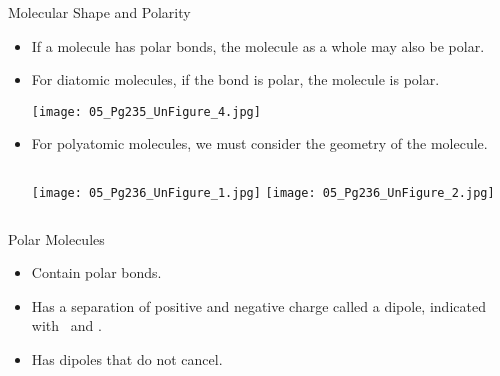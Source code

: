 \documentclass[notes=only]{beamer}
\begin{document}
%
%

\begin{frame}{Molecular Shape and Polarity}
	\begin{itemize}
		\item If a molecule has polar bonds, the molecule as a whole may
			also be polar. \pause
		\item For diatomic molecules, if the bond is polar, the molecule
			is polar.

			\begin{center}
				\texttt{[image: 05\_Pg235\_UnFigure\_4.jpg]}
			\end{center}

			\pause

		\item For polyatomic molecules, we must consider the
			\alert{geometry} of the molecule.

			\begin{columns}
				\centering
				\texttt{[image: 05\_Pg236\_UnFigure\_1.jpg]}
				\centering
				\texttt{[image: 05\_Pg236\_UnFigure\_2.jpg]}
			\end{columns}
	\end{itemize}
\end{frame}

\begin{frame}{Polar Molecules}
	\begin{itemize}
		\item Contain \alert{polar} bonds.
		\item Has a separation of positive and negative charge called a
			dipole, indicated with \delp\ and \delm.
		\item Has dipoles that \alert{do not} cancel.
	\end{itemize}

	\bigskip

	\begin{center}
		\hspace{5em}
	\end{center}
\end{frame}
\end{document}

